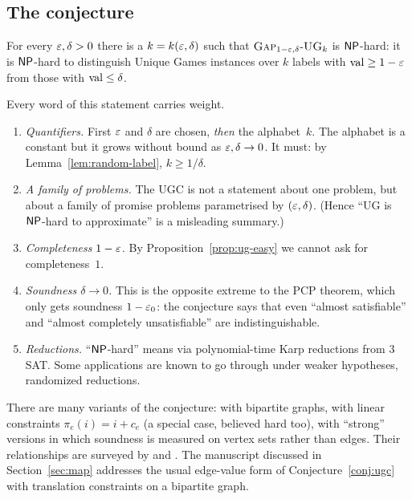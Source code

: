 \subsection{The conjecture}

\begin{conjecture}\label{conj:ugc}
For every $\varepsilon,\delta>0$ there is a $k=k(\varepsilon,\delta)$ such that $\textsc{Gap}_{1-\varepsilon,\delta}\text{-}\textsc{UG}_k$ is $\mathsf{NP}$-hard:
it is $\mathsf{NP}$-hard to distinguish Unique Games instances over $k$ labels with $\operatorname{val}\ge1-\varepsilon$ from those with
$\operatorname{val}\le\delta$.
\end{conjecture}

\noindent
Every word of this statement carries weight.

\begin{enumerate}[label=(\roman*)]
  \item \emph{Quantifiers.}  First $\varepsilon$ and $\delta$ are chosen, \emph{then} the alphabet~$k$.  The
        alphabet is a constant but it grows without bound as $\varepsilon,\delta\to0$.  It must:
        by Lemma~\ref{lem:random-label}, $k\ge1/\delta$.
  \item \emph{A family of problems.}  The UGC is not a statement about one problem, but about
        a family of promise problems parametrised by $(\varepsilon,\delta)$.  (Hence ``UG is $\mathsf{NP}$-hard to
        approximate'' is a misleading summary.)
  \item \emph{Completeness $1-\varepsilon$.}  By Proposition~\ref{prop:ug-easy} we cannot ask for completeness~$1$.
  \item \emph{Soundness $\delta\to 0$.}  This is the opposite extreme to the PCP theorem, which only
        gets soundness $1-\varepsilon_0$: the conjecture says that even ``almost satisfiable'' and ``almost
        completely unsatisfiable'' are indistinguishable.
  \item \emph{Reductions.}  ``$\mathsf{NP}$-hard'' means via polynomial-time Karp reductions from $3$SAT.  Some
        applications are known to go through under weaker hypotheses, \eg randomized reductions.
\end{enumerate}

\begin{remark}
There are many variants of the conjecture: with bipartite graphs, with linear constraints
$\pi_e(i)=i+c_e$ (a special case, believed hard too), with ``strong'' versions in which
soundness is measured on vertex sets rather than edges.  Their relationships are surveyed by
\citet{Khot10} and \citet{Trevisan12}.  The manuscript discussed in Section~\ref{sec:map} addresses the
usual edge-value form of Conjecture~\ref{conj:ugc} with translation constraints on a bipartite graph.
\end{remark}


